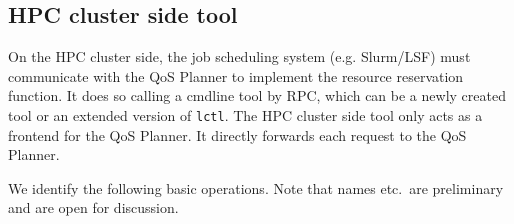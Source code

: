\documentclass[10pt]{article}
\begin{document}
\subsection{HPC cluster side tool}
On the HPC cluster side, the job scheduling system (e.g. Slurm/LSF) must communicate with the QoS Planner to implement the resource reservation function.
It does so calling a cmdline tool by RPC, which can be a newly created tool or an extended version of \texttt{lctl}.
The HPC cluster side tool only acts as a frontend for the QoS Planner.
It directly forwards each request to the QoS Planner.

We identify the following basic operations.
Note that names etc.\ are preliminary and are open for discussion.

\end{document}
